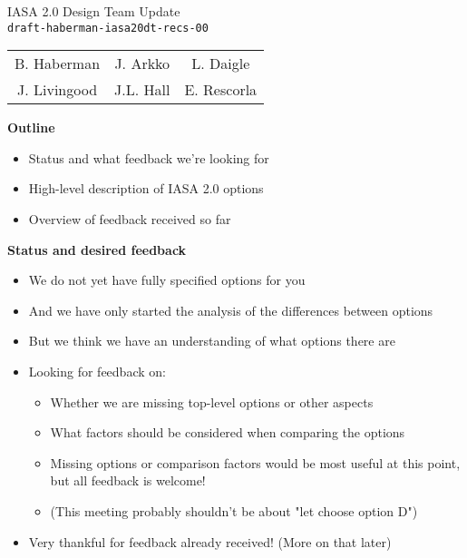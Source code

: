 \documentclass[helvetica]{seminar}
\newcommand{\heading}[1]{%
  \begin{center} 
    \large\bf 
    #1 
  \end{center} 
  \vspace{.4 in}}
\begin{document}
\begin{slide}
\begin{center}
\vspace{.5 in}
\LARGE{{\bf}IASA 2.0 Design Team Update\\{\small \verb^draft-haberman-iasa20dt-recs-00^}}\\
\vspace{.2in}
\large{
\begin{tabular}{ c c c }
B. Haberman & J. Arkko & L. Daigle \\
J. Livingood & J.L. Hall & E. Rescorla 
\end{tabular}
}
\end{center}
\end{slide}

\centerslidesfalse 

\begin{slide}
\heading{Outline}

\begin{itemize}
\item Status and what feedback we're looking for
\item High-level description of IASA 2.0 options
\item Overview of feedback received so far
\end{itemize}

\end{slide}


\begin{slide}

\heading{Status and desired feedback}

\begin{itemize}
\item We do not yet have fully specified options for you
\item And we have only started the analysis of the differences between options
\item But we think we have an understanding of what options there are
\item Looking for feedback on:
  \begin{itemize}
  \item Whether we are missing top-level options or other aspects
  \item What factors should be considered when comparing the options
  \item Missing options or comparison factors would be most useful at this point, but all feedback is welcome!
  \item (This meeting probably shouldn't be about "let choose option D")
  \end{itemize}
\item Very thankful for feedback already received! (More on that later)
\end{itemize}

\end{slide}
\end{document}
